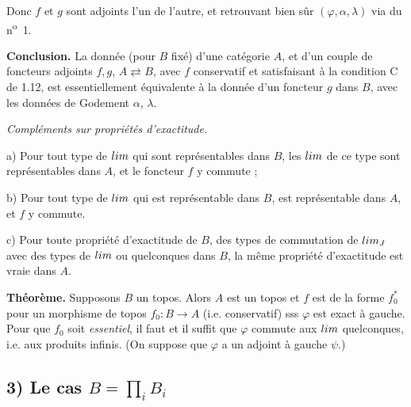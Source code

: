 \documentclass[11pt,a4paper]{article}
\begin{document}
\struck{\ill{}}

Donc $f$ et $g$ sont adjoints l'un de l'autre, et retrouvant bien sûr
$(\varphi, \alpha, \lambda)$ via  du n\textsuperscript{o}~1.

\textbf{Conclusion.} La donnée (pour $B$ fixé) d'une catégorie $A$, et d'un
couple de foncteurs adjoints $f, g$, $A \rightleftarrows B$, avec $f$
conservatif et  satisfaisant à
la condition C de 1.12, est essentiellement équivalente à la donnée d'un
foncteur $g$ dans $B$, avec les données de Godement $\alpha$, $\lambda$.


\emph{Compléments sur propriétés d'exactitude.}

a) Pour tout type de $\varprojlim$ qui sont représentables dans $B$, les
$\varprojlim$ de ce type sont représentables dans $A$, et le foncteur $f$ y
commute ; 

b) Pour tout type de $\varprojlim$ qui est représentable dans $B$, \ill{} est
représentable dans $A$, et $f$ y commute.

c) Pour toute propriété d'exactitude de $B$,  des
types de commutation de $\varprojlim_{J}$  avec des types de
$\varinjlim$ ou quelconques dans $B$, \ill{} la même propriété d'exactitude est
vraie dans $A$.


\textbf{Théorème.} Supposons $B$ un topos. Alors $A$ est un topos et $f$ est de
la forme $f_{0}^{*}$ pour un morphisme de topos $f_{0} : B \to A$ 
(i.e. conservatif) sss $\varphi$  est exact à gauche.
Pour que $f_{0}$ soit \emph{essentiel}, il faut et il suffit que $\varphi$
commute aux $\varprojlim$ quelconques, i.e. aux produits infinis. (On suppose
que $\varphi$ a un adjoint à gauche $\psi$.)

\subsection*{3) Le cas $B = \prod_{i} B_{i}$}
\end{document}
